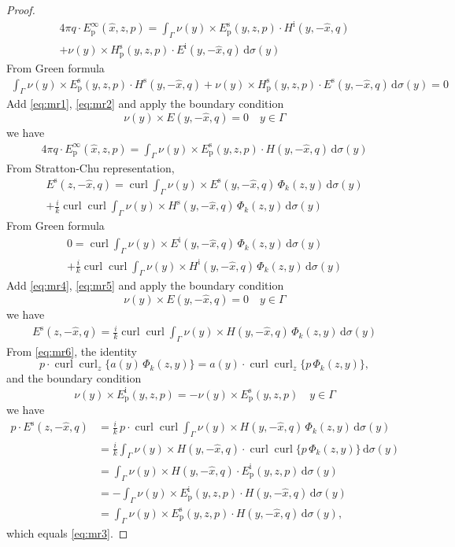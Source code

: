 \documentclass[a4paper,12pt]{article}
\theoremstyle{definition}
\newcommand\bdr{\Gamma}
\newcommand\ints[2][y]{\int_{\bdr}#2\,\text{d}\sigma(#1)}
\DeclareMathOperator\curl{curl}
\begin{document}
\begin{proof}
  \begin{multline}\label{eq:mr1}
    4\pi q\cdot E_\text{p}^\infty(\hat{x}, z, p) = \ints{\nu(y)\times E_\text{p}^\text{s}(y, z, p)\cdot H^\text{i}(y, -\hat{x}, q) \\+ \nu(y)\times H_\text{p}^\text{s}(y, z, p)\cdot E^\text{i}(y, -\hat{x}, q)} 
  \end{multline}
  From Green formula 
  \begin{align}\label{eq:mr2}
    \ints{\nu(y)\times E_\text{p}^\text{s}(y, z, p)\cdot H^\text{s}(y, -\hat{x}, q) + \nu(y)\times H_\text{p}^\text{s}(y, z, p)\cdot E^\text{s}(y, -\hat{x}, q)} = 0 
  \end{align}
  Add \eqref{eq:mr1}, \eqref{eq:mr2} and apply the boundary condition $$\nu(y)\times E(y, -\hat{x}, q)=0\quad y\in\bdr$$ we have
  \begin{align}\label{eq:mr3}
    4\pi q\cdot E_\text{p}^\infty(\hat{x}, z, p)= \ints{\nu(y)\times E_\text{p}^\text{s}(y, z, p)\cdot H(y, -\hat{x}, q)} 
  \end{align}
  From Stratton-Chu representation,  
  \begin{multline}\label{eq:mr4}
    E^\text{s}(z, -\hat{x}, q) = \curl\ints{\nu(y)\times E^\text{s}(y, -\hat{x}, q)\,\Phi_k(z, y)}\\+\frac{i}{k}\curl\curl\ints{\nu(y)\times H^\text{s}(y, -\hat{x}, q)\,\Phi_k(z, y)}
  \end{multline}
  From Green formula 
  \begin{multline}\label{eq:mr5}
    0 = \curl\ints{\nu(y)\times E^\text{i}(y, -\hat{x}, q)\,\Phi_k(z, y)}\\+\frac{i}{k}\curl\curl\ints{\nu(y)\times H^\text{i}(y, -\hat{x}, q)\,\Phi_k(z, y)}
  \end{multline}
  Add \eqref{eq:mr4}, \eqref{eq:mr5} and apply the boundary condition $$\nu(y)\times E(y, -\hat{x}, q)=0\quad y\in\bdr$$ we have
  \begin{align}\label{eq:mr6}
    E^\text{s}(z, -\hat{x}, q) = \frac{i}{k}\curl\curl\ints{\nu(y)\times H(y, -\hat{x}, q)\,\Phi_k(z, y)}
  \end{align}
  From \eqref{eq:mr6}, the identity $$p\cdot\curl\curl_z\{a(y)\,\Phi_k(z, y)\}=a(y)\cdot\curl\curl_z\{p\,\Phi_k(z, y)\},$$ and the boundary condition $$\nu(y)\times E_\text{p}^\text{i}(y, z, p) = -\nu(y)\times E_\text{p}^\text{s}(y, z, p)\quad y\in\bdr$$ we have 
  \begin{align*}
    p\cdot E^\text{s}(z, -\hat{x}, q) &= \frac{i}{k}\,p\cdot\curl\curl\ints{\nu(y)\times H(y, -\hat{x}, q)\,\Phi_k(z, y)} \\
    &=\frac{i}{k}\ints{\nu(y)\times H(y, -\hat{x}, q)\cdot\curl\curl\{p\,\Phi_k(z, y)\}} \\
    &=\ints{\nu(y)\times H(y, -\hat{x}, q)\cdot E_\text{p}^\text{i}(y, z, p)} \\
    &=-\ints{\nu(y)\times E_\text{p}^\text{i}(y, z, p)\cdot H(y, -\hat{x}, q)} \\
    &=\ints{\nu(y)\times E_\text{p}^\text{s}(y, z, p)\cdot H(y, -\hat{x}, q)},
   \end{align*}
   which equals \eqref{eq:mr3}.
\end{proof}
\end{document}
